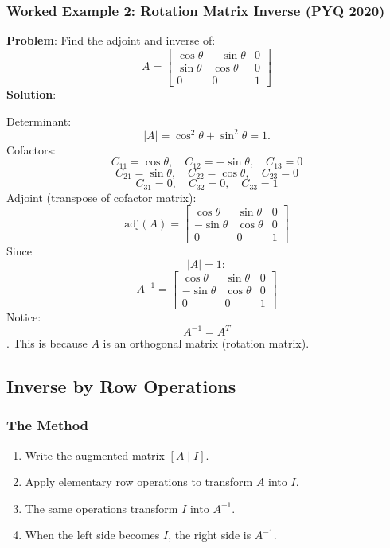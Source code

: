 \documentclass[
]{article}
\providecommand{\tightlist}{%
  \setlength{\itemsep}{0pt}\setlength{\parskip}{0pt}}
\begin{document}
\subsubsection{Worked Example 2: Rotation Matrix Inverse (PYQ
2020)}\label{worked-example-2-rotation-matrix-inverse-pyq-2020}

\textbf{Problem}: Find the adjoint and inverse of:
\[
A =
\begin{bmatrix}
\cos\theta & -\sin\theta & 0 \\
\sin\theta & \cos\theta & 0 \\
0 & 0 & 1
\end{bmatrix}
\]
\textbf{Solution}:

Determinant:
\[
\lvert A \rvert = \cos^2\theta + \sin^2\theta = 1.
\]
Cofactors:
\[
C_{11} = \cos\theta, \quad C_{12} = -\sin\theta, \quad C_{13} = 0
\]
\[
C_{21} = \sin\theta, \quad C_{22} = \cos\theta, \quad C_{23} = 0
\]
\[
C_{31} = 0, \quad C_{32} = 0, \quad C_{33} = 1
\]
Adjoint (transpose of cofactor matrix):
\[
\text{adj}(A) =
\begin{bmatrix}
\cos\theta & \sin\theta & 0 \\
-\sin\theta & \cos\theta & 0 \\
0 & 0 & 1
\end{bmatrix}
\]
Since
\[
\lvert A \rvert = 1:
\]
\[
A^{-1} =
\begin{bmatrix}
\cos\theta & \sin\theta & 0 \\
-\sin\theta & \cos\theta & 0 \\
0 & 0 & 1
\end{bmatrix}
\]
Notice:
\[
A^{-1} = A^T
\]
. This is because \(A\) is an orthogonal matrix (rotation matrix).

\subsection{Inverse by Row Operations}\label{inverse-by-row-operations}

\subsubsection{The Method}\label{the-method-6}

\begin{enumerate}
\def\labelenumi{\arabic{enumi}.}
\tightlist
\item
  Write the augmented matrix \([A \; \lvert  \; I]\).
\item
  Apply elementary row operations to transform \(A\) into \(I\).
\item
  The same operations transform \(I\) into \(A^{-1}\).
\item
  When the left side becomes \(I\), the right side is \(A^{-1}\).
\end{enumerate}
\end{document}

